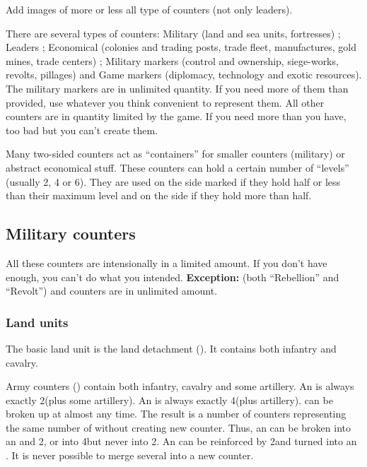 \begin{todo}
  Add images of more or less all type of counters (not only leaders).
\end{todo}


 There are several types of counters: Military (land
and sea units, fortresses) ; Leaders ; Economical (colonies and trading posts,
trade fleet, manufactures, gold mines, trade centers) ; Military markers
(control and ownership, siege-works, revolts, pillages) and Game markers
(diplomacy, technology and exotic resources).
\bparag The military markers are in unlimited quantity. If you need more of
them than provided, use whatever you think convenient to represent them.
\bparag All other counters are in quantity limited by the game. If you need
more than you have, too bad but you can't create them.

 Many two-sided counters act as ``containers'' for
smaller counters (military) or abstract economical stuff.
\bparag These counters can hold a certain number of ``levels'' (usually 2, 4
or 6).
\bparag They are used on the side marked \Facemoins if they hold half or less
than their maximum level and on the side \Faceplus if they hold more than
half.



\subsection{Military counters}

\aparag All these counters are intensionally in a limited amount. If you don't
have enough, you can't do what you intended.
\bparag \textbf{Exception:}  (both ``Rebellion'' and
``Revolt'') and  counters are in unlimited amount.


\subsubsection{Land units}
\aparag[Detachments] The basic land unit is the land detachment (\LD). It
contains both infantry and cavalry.

\aparag[Armies] Army counters (\ARMY) contain both infantry, cavalry and some
artillery.
\bparag An \ARMY\facemoins is always exactly 2\LD (plus some artillery). An
\ARMY\faceplus is always exactly 4\LD (plus artillery).
\bparag \ARMY can be broken up at almost any time. The result is a number of
counters representing the same number of \LD without creating new \ARMY
counter.
\bparag Thus, an \ARMY\faceplus can be broken into an \ARMY\facemoins and
2\LD, or into 4\LD but never into 2\ARMY\facemoins.
\bparag An \ARMY\facemoins can be reinforced by 2\LD and turned into an
\ARMY\faceplus.
\bparag It is never possible to merge several \LD into a new \ARMY counter.

